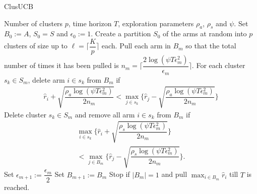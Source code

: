 \begin{algorithm}[t]
\caption{ClusUCB}
\label{alg:clusucb}
\begin{algorithmic}
 Number of clusters $p$, time horizon $T$, exploration parameters $\rho_a$, $\rho_s$ and $\psi$.
 Set $B_{0}:=A$, $S_0 = S$ and $\epsilon_{0}:=1$.
\State Create a partition $S_0$ of the arms at random into $p$ clusters of size up to $\ell=\bigg\lceil \dfrac{K}{p} \bigg\rceil$ each.
\State Pull each arm in $B_m$ so that the total number of times it has been pulled is $n_{m}=\bigg\lceil\dfrac{2\log{(\psi T\epsilon_{m}^{2})}}{\epsilon_{m}}\bigg\rceil$. 
\ArmElim
\State For each cluster $s_k \in S_{m}$, delete arm ${i}\in s_{k}$ from $B_{m}$ if
\begin{align*}
\hat{r}_{i} + \sqrt{\dfrac{\rho_{a}\log{(\psi T\epsilon_{m}^{2})}}{2 n_{m}}}  < \max_{{j}\in s_{k}}\bigg\lbrace\hat{r}_{j} -\sqrt{\dfrac{\rho_{a}\log{(\psi T\epsilon_{m}^{2})}}{2 n_{m}}} \bigg\rbrace
\end{align*}
\EndArmElim
\ClusElim
\State Delete cluster $s_{k}\in S_{m}$ and remove all arm $i\in s_{k}$ from $B_{m}$ if 
\begin{align*}
 \max_{{i}\in s_{k}}\bigg\lbrace\hat{r}_{i} + \sqrt{\dfrac{\rho_{s}\log{(\psi T\epsilon_{m}^{2})}}{2 n_{m}}}\bigg\rbrace  \\
 < \max_{{j}\in B_{m}} \bigg\lbrace\hat{r}_{j} - \sqrt{\dfrac{\rho_{s} \log{(\psi T\epsilon_{m}^{2})}}{2 n_{m}}}\bigg\rbrace.
\end{align*}
\EndClusElim
\State Set $\epsilon_{m+1}:=\dfrac{\epsilon_{m}}{2}$\vspace{0.5ex}
\State Set $B_{m+1}:=B_{m}$
\State Stop if $|B_{m}|=1$ and pull $\max_{{i}\in B_{m}}\hat{r}_{i}$ till $T$ is reached.
\EndFor
\end{algorithmic}
\end{algorithm}

